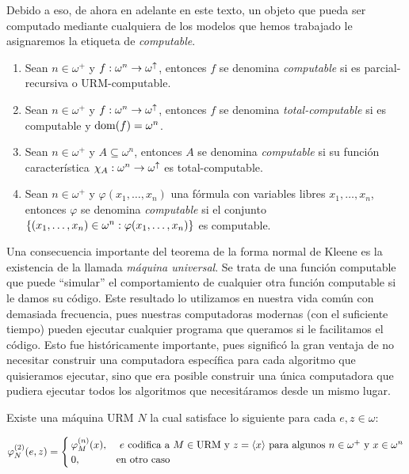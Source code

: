 Debido a eso, de ahora en adelante en este texto, un objeto que pueda ser computado mediante cualquiera de los modelos que hemos trabajado le asignaremos la etiqueta de \emph{computable}.

\begin{definition}[Computabilidad]
	\begin{enumerate}
		\item Sean $n\in\omega^{+}$ y $f:\omega^{n}\to\omega^{\uparrow}$, entonces $f$ se denomina \emph{computable} si es parcial-recursiva o URM-computable.
		\item Sean $n\in\omega^{+}$ y $f:\omega^{n}\to\omega^{\uparrow}$, entonces $f$ se denomina \emph{total-computable} si es computable y $\DOMINIO{f} =\omega^{n}$.
		\item Sean $n\in\omega^{+}$ y $A\subseteq\omega^{n}$, entonces $A$ se denomina \emph{computable} si su función característica $\chi_{A}:\omega^{n}\to\omega^{\uparrow}$ es total-computable.
		\item Sean $n\in\omega^{+}$ y $\varphi(x_{1},\dotsc, x_{n})$ una fórmula con variables libres $x_{1},\dotsc, x_{n}$, entonces $\varphi$ se denomina \emph{computable} si el conjunto $\set*{\pa*{x_{1},\dotsc, x_{n}}\in\omega^{n}:\varphi\pa*{x_{1},\dotsc, x_{n}}}$ es computable.
	\end{enumerate}
\end{definition}

Una consecuencia importante del teorema de la forma normal de Kleene es la existencia de la llamada \emph{máquina universal}. Se trata de una función computable que puede ``simular'' el comportamiento de cualquier otra función computable si le damos su código. Este resultado lo utilizamos en nuestra vida común con demasiada frecuencia, pues nuestras computadoras modernas (con el suficiente tiempo) pueden ejecutar cualquier programa que queramos si le facilitamos el código. Esto fue históricamente importante, pues significó la gran ventaja de no necesitar construir una computadora específica para cada algoritmo que quisieramos ejecutar, sino que era posible construir una única computadora que pudiera ejecutar todos los algoritmos que necesitáramos desde un mismo lugar.

\begin{theorem}
	Existe una máquina URM $N$ la cual satisface lo siguiente para cada $e, z\in\omega$:

	\[
		\PHI{N}[2]\pa*{e, z} =
		\begin{cases}
			\PHI{M}[n]\pa*{x}, &\text{ $e$ codifica a $M\in\URM$ y $z =\inner*{x}$ para algunos $n\in\omega^{+}$ y $x\in\omega^{n}$}\\
			0, &\text{en otro caso}
		\end{cases}
	\]
\end{theorem}

